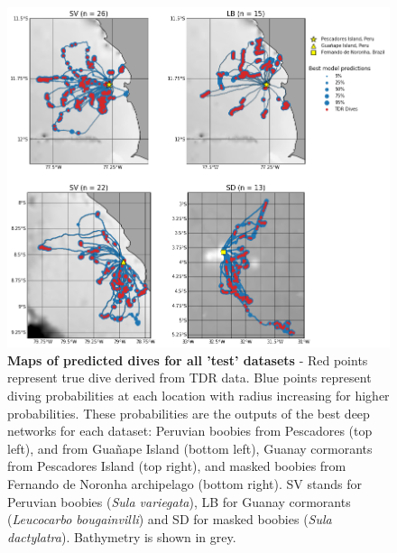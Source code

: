 \documentclass{article}
\begin{document}
\begin{figure}[!h]
  \centering
  \includegraphics[scale=0.5]{figure_map_prediction.png}
  \caption{\textbf{Maps of predicted dives for all 'test' datasets} - Red points represent true dive derived from TDR data. Blue points represent diving probabilities at each location with radius increasing for higher probabilities. These probabilities are the outputs of the best deep networks for each dataset: Peruvian boobies from Pescadores (top left), and from Guañape Island (bottom left), Guanay cormorants from Pescadores Island (top right), and masked boobies from Fernando de Noronha archipelago (bottom right). SV stands for Peruvian boobies (\textit{Sula variegata}), LB for Guanay cormorants (\textit{Leucocarbo bougainvilli}) and SD for masked boobies (\textit{Sula dactylatra}). Bathymetry is shown in grey.}
  \label{figure_map_prediction}
\end{figure}
\end{document}
